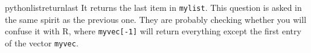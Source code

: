 \begin{answer}{pythonlistreturnlast}
It returns the last item in \verb+mylist+.
This question is asked in the same spirit as the previous one.
They are probably checking whether you will confuse it with R, where
\verb+myvec[-1]+ will return everything except the first entry of the vector \verb+myvec+.
\end{answer}

